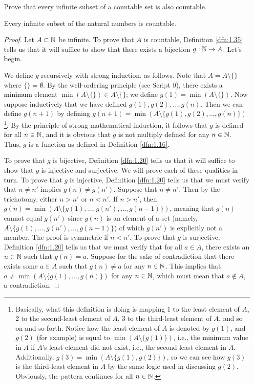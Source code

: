 \documentclass[../main.tex]{subfiles}
\begin{document}
\begin{exercise}\label{exr:1.37}
    Prove that every infinite subset of a countable set is also countable.
    \begin{lemma*}
        Every infinite subset of the natural numbers is countable.
        \begin{proof}
            Let $A\subset\mathbb{N}$ be infinite. To prove that $A$ is countable, Definition \ref{dfn:1.35} tells us that it will suffice to show that there exists a bijection $g:\mathbb{N}\to A$. Let's begin.\par
            We define $g$ recursively with strong induction, as follows. Note that $A=A\setminus\{\}$ where $\{\}=\emptyset$. By the well-ordering principle (see Script 0), there exists a minimum element $\min(A\setminus\{\})\in A\setminus\{\}$; we define $g(1)=\min(A\setminus\{\})$. Now suppose inductively that we have defined $g(1),g(2),\dots,g(n)$. Then we can define $g(n+1)$ by defining $g(n+1)=\min(A\setminus\{g(1),g(2),\dots,g(n)\})$\footnote{Basically, what this definition is doing is mapping 1 to the least element of $A$, 2 to the second-least element of $A$, 3 to the third-least element of $A$, and so on and so forth. Notice how the least element of $A$ is denoted by $g(1)$, and $g(2)$ (for example) is equal to $\min(A\setminus\{g(1)\})$, i.e., the minimum value in $A$ if $A$'s least element did not exist, i.e., the second-least element in $A$. Additionally, $g(3)=\min(A\setminus\{g(1),g(2)\})$, so we can see how $g(3)$ is the third-least element in $A$ by the same logic used in discussing $g(2)$. Obviously, the pattern continues for all $n\in\mathbb{N}$.}. By the principle of strong mathematical induction, it follows that $g$ is defined for all $n\in\mathbb{N}$, and it is obvious that $g$ is not multiply defined for any $n\in\mathbb{N}$. Thus, $g$ is a function as defined in Definition \ref{dfn:1.16}.\par
            To prove that $g$ is bijective, Definition \ref{dfn:1.20} tells us that it will suffice to show that $g$ is injective and surjective. We will prove each of these qualities in turn. To prove that $g$ is injective, Definition \ref{dfn:1.20} tells us that we must verify that $n\neq n'$ implies $g(n)\neq g(n')$. Suppose that $n\neq n'$. Then by the trichotomy, either $n>n'$ or $n<n'$. If $n>n'$, then $g(n)=\min(A\setminus\{g(1),\dots,g(n'),\dots,g(n-1)\})$, meaning that $g(n)$ cannot equal $g(n')$ since $g(n)$ is an element of a set (namely, $A\setminus\{g(1),\dots,g(n'),\dots,g(n-1)\}$) of which $g(n')$ is explicitly not a member. The proof is symmetric if $n<n'$. To prove that $g$ is surjective, Definition \ref{dfn:1.20} tells us that we must verify that for all $a\in A$, there exists an $n\in\mathbb{N}$ such that $g(n)=a$. Suppose for the sake of contradiction that there exists some $a\in A$ such that $g(n)\neq a$ for any $n\in\mathbb{N}$. This implies that $a\neq\min(A\setminus\{g(1),\dots,g(n)\})$ for any $n\in\mathbb{N}$, which must mean that $a\notin A$, a contradiction.

\end{proof}
\end{lemma*}
\end{exercise}
\end{document}
